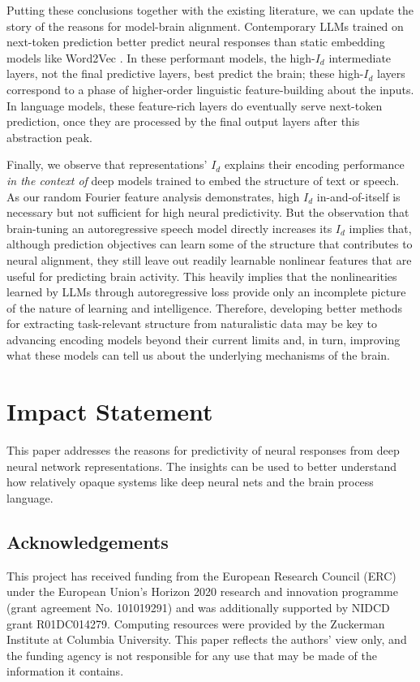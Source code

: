 \documentclass{article}
\theoremstyle{plain}
\theoremstyle{definition}
\theoremstyle{remark}
\begin{document}
Putting these conclusions together with the existing literature, we can update the story of the reasons for model-brain alignment. Contemporary LLMs trained on next-token prediction better predict neural responses than static embedding models like Word2Vec \citep{Caucheteux2020.07.03.186288,schrimpf2021neural,goldstein2022shared}. In these performant models, the high-$I_d$ intermediate layers, not the final predictive layers, best predict the brain; these high-$I_d$ layers correspond to a phase of higher-order linguistic feature-building about the inputs. In language models, these feature-rich layers do eventually serve next-token prediction, once they are processed by the final output layers after this abstraction peak. 

Finally, we observe that representations' $I_d$ explains their encoding performance \emph{in the context of} deep models trained to embed the structure of text or speech. As our random Fourier feature analysis demonstrates, high $I_d$ in-and-of-itself is necessary but not sufficient for high neural predictivity. But the observation that brain-tuning an autoregressive speech model directly increases its $I_d$ implies that, although prediction objectives can learn some of the structure that contributes to neural alignment, they still leave out readily learnable nonlinear features that are useful for predicting brain activity. This heavily implies that the nonlinearities learned by LLMs through autoregressive loss provide only an incomplete picture of the nature of learning and intelligence. Therefore, developing better methods for extracting task-relevant structure from naturalistic data may be key to advancing encoding models beyond their current limits and, in turn, improving  what these models can tell us about the underlying mechanisms of the brain.
\section*{Impact Statement}
This paper addresses the reasons for predictivity of neural responses from deep neural network representations. The insights can be used to better understand how relatively opaque systems like deep neural nets and the brain process language.

\subsection*{Acknowledgements} This project has received funding from the European Research Council (ERC) under the European Union’s Horizon 2020 research and innovation programme (grant agreement No. 101019291) and was additionally supported by NIDCD grant R01DC014279. Computing resources were provided by the Zuckerman Institute at Columbia University. This paper reflects the authors’ view only, and the funding agency is not responsible for any use that may be made of the information it contains.
\end{document}
